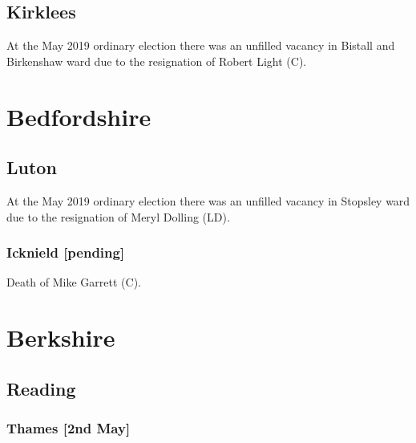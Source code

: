 \documentclass[a4paper,openany]{book}
\begin{document}
\begin{resultsiii}
\subsection*{Kirklees}

At the May 2019 ordinary election there was an unfilled vacancy in Bistall and Birkenshaw ward due to the resignation of Robert Light (C).

\section{Bedfordshire}

\subsection*{Luton}

At the May 2019 ordinary election there was an unfilled vacancy in Stopsley ward due to the resignation of Meryl Dolling (LD).

\subsubsection*{Icknield \hspace*{\fill}\nolinebreak[1]%
	\enspace\hspace*{\fill}
	[pending]}


Death of Mike Garrett (C).

\section{Berkshire}

\subsection*{Reading}

\subsubsection*{Thames \hspace*{\fill}\nolinebreak[1]%
	\enspace\hspace*{\fill}
	[2nd May]}



\end{resultsiii}
\end{document}
